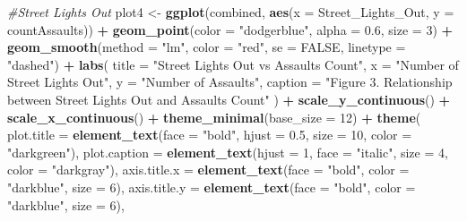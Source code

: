 \documentclass[
]{article}
\newenvironment{Shaded}{\begin{snugshade}}{\end{snugshade}}
\newcommand{\AttributeTok}[1]{\textcolor[rgb]{0.13,0.29,0.53}{#1}}
\newcommand{\CommentTok}[1]{\textcolor[rgb]{0.56,0.35,0.01}{\textit{#1}}}
\newcommand{\ConstantTok}[1]{\textcolor[rgb]{0.56,0.35,0.01}{#1}}
\newcommand{\DecValTok}[1]{\textcolor[rgb]{0.00,0.00,0.81}{#1}}
\newcommand{\FloatTok}[1]{\textcolor[rgb]{0.00,0.00,0.81}{#1}}
\newcommand{\FunctionTok}[1]{\textcolor[rgb]{0.13,0.29,0.53}{\textbf{#1}}}
\newcommand{\NormalTok}[1]{#1}
\newcommand{\OtherTok}[1]{\textcolor[rgb]{0.56,0.35,0.01}{#1}}
\newcommand{\SpecialCharTok}[1]{\textcolor[rgb]{0.81,0.36,0.00}{\textbf{#1}}}
\newcommand{\StringTok}[1]{\textcolor[rgb]{0.31,0.60,0.02}{#1}}
\begin{document}
\begin{Shaded}
\begin{Highlighting}[]
\CommentTok{\#Street Lights Out}
\NormalTok{plot4 }\OtherTok{\textless{}{-}} \FunctionTok{ggplot}\NormalTok{(combined, }\FunctionTok{aes}\NormalTok{(}\AttributeTok{x =} \StringTok{\textasciigrave{}}\AttributeTok{Street\_Lights\_Out}\StringTok{\textasciigrave{}}\NormalTok{, }\AttributeTok{y =} \StringTok{\textasciigrave{}}\AttributeTok{countAssaults}\StringTok{\textasciigrave{}}\NormalTok{)) }\SpecialCharTok{+} 
  \FunctionTok{geom\_point}\NormalTok{(}\AttributeTok{color =} \StringTok{"dodgerblue"}\NormalTok{, }\AttributeTok{alpha =} \FloatTok{0.6}\NormalTok{, }\AttributeTok{size =} \DecValTok{3}\NormalTok{) }\SpecialCharTok{+}
  \FunctionTok{geom\_smooth}\NormalTok{(}\AttributeTok{method =} \StringTok{"lm"}\NormalTok{, }\AttributeTok{color =} \StringTok{"red"}\NormalTok{, }\AttributeTok{se =} \ConstantTok{FALSE}\NormalTok{, }\AttributeTok{linetype =} \StringTok{"dashed"}\NormalTok{) }\SpecialCharTok{+}
  \FunctionTok{labs}\NormalTok{(}
    \AttributeTok{title =} \StringTok{"Street Lights Out vs Assaults Count"}\NormalTok{,  }
    \AttributeTok{x =} \StringTok{"Number of Street Lights Out"}\NormalTok{,}
    \AttributeTok{y =} \StringTok{"Number of Assaults"}\NormalTok{,}
    \AttributeTok{caption =} \StringTok{"Figure 3. Relationship between Street Lights Out and Assaults Count"}
\NormalTok{  ) }\SpecialCharTok{+} 
  \FunctionTok{scale\_y\_continuous}\NormalTok{() }\SpecialCharTok{+}
  \FunctionTok{scale\_x\_continuous}\NormalTok{() }\SpecialCharTok{+} 
  \FunctionTok{theme\_minimal}\NormalTok{(}\AttributeTok{base\_size =} \DecValTok{12}\NormalTok{) }\SpecialCharTok{+}
  \FunctionTok{theme}\NormalTok{(}
    \AttributeTok{plot.title =} \FunctionTok{element\_text}\NormalTok{(}\AttributeTok{face =} \StringTok{"bold"}\NormalTok{, }\AttributeTok{hjust =} \FloatTok{0.5}\NormalTok{, }\AttributeTok{size =} \DecValTok{10}\NormalTok{, }\AttributeTok{color =} \StringTok{"darkgreen"}\NormalTok{),}
    \AttributeTok{plot.caption =} \FunctionTok{element\_text}\NormalTok{(}\AttributeTok{hjust =} \DecValTok{1}\NormalTok{, }\AttributeTok{face =} \StringTok{"italic"}\NormalTok{, }\AttributeTok{size =} \DecValTok{4}\NormalTok{, }\AttributeTok{color =} \StringTok{"darkgray"}\NormalTok{),}
    \AttributeTok{axis.title.x =} \FunctionTok{element\_text}\NormalTok{(}\AttributeTok{face =} \StringTok{"bold"}\NormalTok{, }\AttributeTok{color =} \StringTok{"darkblue"}\NormalTok{, }\AttributeTok{size =} \DecValTok{6}\NormalTok{),}
    \AttributeTok{axis.title.y =} \FunctionTok{element\_text}\NormalTok{(}\AttributeTok{face =} \StringTok{"bold"}\NormalTok{, }\AttributeTok{color =} \StringTok{"darkblue"}\NormalTok{, }\AttributeTok{size =} \DecValTok{6}\NormalTok{),}

\end{Highlighting}
\end{Shaded}
\end{document}
